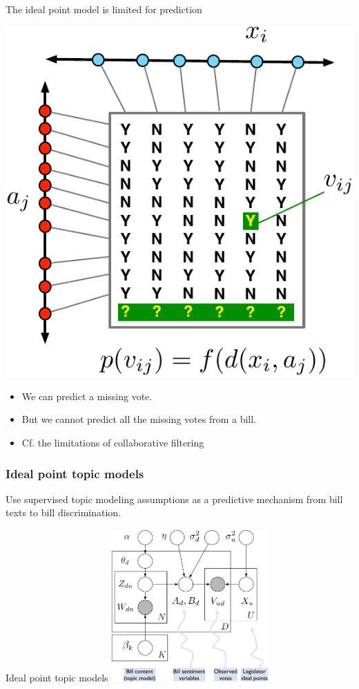 \message{ !name(sgerrish_prefpo.tex)}\documentclass{beamer}
\begin{document}
\begin{frame}{The ideal point model is limited for prediction}
  \begin{center}
    \includegraphics[scale=0.6]{figs/ideal-point-prediction-intuition.pdf}
  \end{center}
  \begin{itemize}
  \item We can predict a missing vote.
  \item But we cannot predict all the missing votes from a bill.
  \item Cf. the limitations of collaborative filtering
  \end{itemize}
\end{frame}

\begin{frame}
  \frametitle{Ideal point topic models}
    Use supervised topic modeling assumptions as a predictive
    mechanism from bill texts to bill discrimination.
\end{frame}

\begin{frame}{Ideal point topic models}
  \includegraphics[width=0.45\textwidth]{figs/ideal-point.pdf}
\end{frame}
\end{document}
